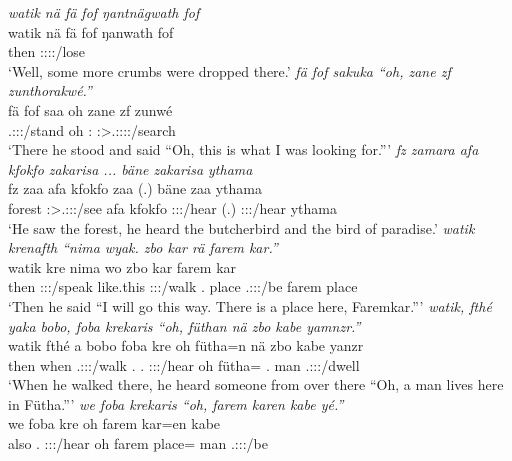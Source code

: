 \begin{exe}
	\emph{watik nä fä fof ŋantnägwath fof}\\
	\gll watik nä fä fof ŋanwath fof\\ 
	then \Indf{} \Dist{} \Emph{} \Stpl:\Sbj:\Pst:\Ipfv:\Venit/lose \Emph{}\\
	\trans `Well, some more crumbs were dropped there.'
	\emph{fä fof sakuka ``oh, zane zf zunthorakwé.''}\\
	\gll fä fof saa oh zane zf zunwé\\ 
	\Dist{} \Emph{} \Tsg.\Masc:\Sbj:\Pst:\Pfv/stand oh \Dem:\Prox{} \Imm{} \Fsg:\Sbj>\Tsg.\F:\Obj:\Rpst:\Ipfv:\Venit/search\\
	\trans `There he stood and said ``Oh, this is what I was looking for.'''
	\emph{fz zamara afa kfokfo zakarisa ... bäne zakarisa ythama}\\
	\gll fz zaa {afa kfokfo} zaa (.) bäne zaa ythama\\ 
	forest \Sg:\Sbj>\Tsg.\F:\Obj:\Pst:\Pfv/see {afa kfokfo} \Sg:\Sbj:\Pst:\Pfv/hear (.) \Recog{} \Sg:\Sbj:\Pst:\Pfv/hear ythama\\
	\trans `He saw the forest, he heard the butcherbird and the bird of paradise.'
	\emph{watik krenafth ``nima wyak. zbo kar rä farem kar.''}\\
	\gll watik kre nima wo zbo kar  farem kar\\ 
	then \Stsg:\Sbj:\Irr:\Pfv/speak like.this \Fsg:\Sbj:\Nonpast:\Ipfv/walk \Prox.\All{} place \Tsg.\F:\Sbj:\Nonpast:\Ipfv/be farem place\\
	\trans `Then he said ``I will go this way. There is a place here, Faremkar.'''
	\emph{watik, fthé yaka bobo, foba krekaris ``oh, füthan nä zbo kabe yamnzr.''}\\
	\gll watik fthé a bobo foba kre oh fütha=n nä zbo kabe yanzr\\ 
	then when \Tsg.\Masc:\Sbj:\Pst:\Ipfv/walk \Med.\All{} \Dist.\Abl{} \Stsg:\Sbj:\Irr:\Pfv/hear oh fütha=\Loc{} \Indf{} \Prox.\All{} man \Tsg.\Masc:\Sbj:\Nonpast:\Ipfv/dwell\\
	\trans `When he walked there, he heard someone from over there ``Oh, a man lives here in Fütha.'''
	\emph{we foba krekaris ``oh, farem karen kabe yé.''}\\
	\gll we foba kre oh farem kar=en kabe \\ 
	also \Dist.\Abl{} \Stsg:\Sbj:\Irr:\Pfv/hear oh farem place=\Loc{} man \Tsg.\Masc:\Sbj:\Nonpast:\Ipfv/be\\

\end{exe}
